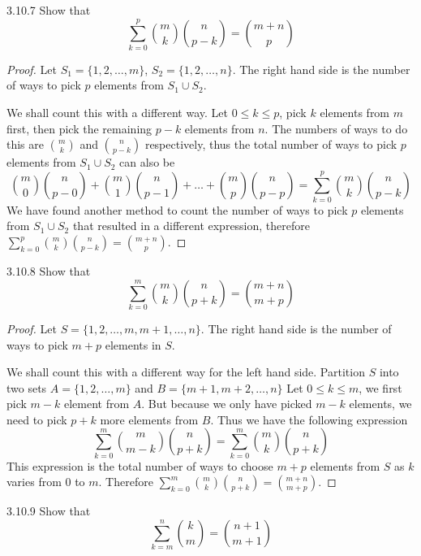 \documentclass{exam}
\begin{document}
\begin{problem}{3.10.7}
    Show that $$\sum_{k=0}^p \binom{m}k\binom{n}{p-k}=\binom{m+n}p$$
\end{problem}

\begin{proof}
    Let $S_1 = \{1, 2,  \dots, m\}$, $S_2 = \{1, 2,  \dots, n\}$. The right hand side is the number of ways to pick $p$ elements from $S_1 \cup S_2$.

    We shall count this with a different way. Let $0 \le k \le p$, pick $k$ elements from $m$ first, then pick the remaining $p-k$ elements from $n$. The numbers of ways to do this are $\binom{m}{k}$ and $\binom{n}{p-k}$ respectively, thus the total number of ways to pick $p$ elements from $S_1 \cup S_2$ can also be \[
    \binom{m}{0}\binom{n}{p-0} + \binom{m}{1}\binom{n}{p-1} + \dots +\binom{m}{p}\binom{n}{p-p}=\sum_{k=0}^p \binom{m}k\binom{n}{p-k}
    \]
    We have found another method to count the number of ways to pick $p$ elements from $S_1\cup S_2$ that resulted in a different expression, therefore $\sum_{k=0}^p \binom{m}k\binom{n}{p-k}=\binom{m+n}p$.
\end{proof}

\begin{problem}{3.10.8}
    Show that $$\sum_{k=0}^m\binom{m}k\binom{n}{p+k}=\binom{m+n}{m+p}$$
\end{problem}

\begin{proof}
    Let $S=\{1, 2,\dots, m, m+1, \dots, n\}$. The right hand side is the number of ways to pick $m+p$ elements in $S$.

    We shall count this with a different way for the left hand side. Partition $S$ into two sets $A = \{1, 2, \dots, m\}$ and $B=\{m+1, m+2, \dots, n\}$ Let $0 \le k \le m$, we first pick $m-k$ element from $A$. But because we only have picked $m-k$ elements, we need to pick $p+k$ more elements from $B$. Thus we have the following expression \[
    \sum_{k=0}^m \binom{m}{m-k}\binom{n}{p+k} = \sum_{k=0}^m \binom{m}{k}\binom{n}{p+k}
    \]
    This expression is the total number of ways to choose $m+p$ elements from $S$ as $k$ varies from 0 to $m$. Therefore $\sum_{k=0}^m\binom{m}k\binom{n}{p+k}=\binom{m+n}{m+p}$.
\end{proof}

\begin{problem}{3.10.9}
    Show that $$\sum_{k=m}^n\binom{k}{m}=\binom{n+1}{m+1}$$
\end{problem}
\end{document}
